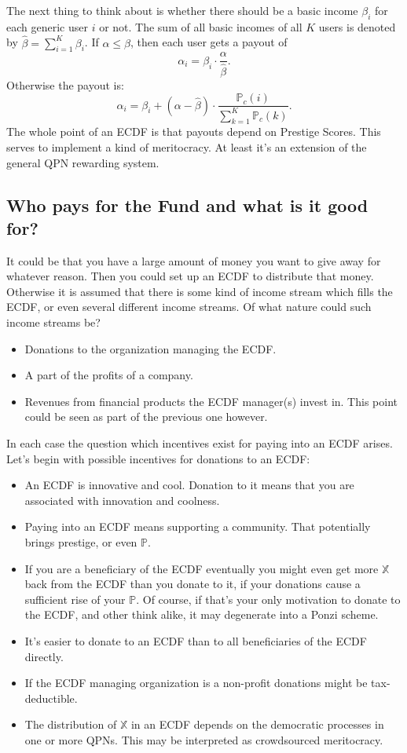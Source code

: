 \documentclass[a4paper,12pt]{scrartcl}
\newcounter{motivation}
\begin{document}
The next thing to think about is whether there should be a basic income $\beta_i$ for each generic user $i$ or not. The sum of all basic incomes of all $K$ users is denoted by $\hat{\beta} = \sum_{i=1}^K \beta_i$. If $\alpha \leq \hat{\beta}$, then each user gets a payout of
$$\alpha_i = \beta_i \cdot \frac{\alpha}{\hat{\beta}}.$$
Otherwise the payout is:
$$\alpha_i = \beta_i + (\alpha - \hat{\beta}) \cdot \frac{\mathbb{P}_c(i)}{\sum_{k=1}^K \mathbb{P}_c(k)}.$$
The whole point of an ECDF is that payouts depend on Prestige Scores. This serves to implement a kind of meritocracy. At least it's an extension of the general QPN rewarding system.


\subsection{Who pays for the Fund and what is it good for?}
It could be that you have a large amount of money you want to give away for whatever reason. Then you could set up an ECDF to distribute that money. Otherwise it is assumed that there is some kind of income stream which fills the ECDF, or even several different income streams. Of what nature could such income streams be?
\begin{itemize}
 \item Donations to the organization managing the ECDF.
 \item A part of the profits of a company.
 \item Revenues from financial products the ECDF manager(s) invest in. This point could be seen as part of the previous one however.
\end{itemize}

In each case the question which incentives exist for paying into an ECDF arises. Let's begin with possible incentives for donations to an ECDF:
\begin{itemize}
 \item An ECDF is innovative and cool. Donation to it means that you are associated with innovation and coolness.
 \item Paying into an ECDF means supporting a community. That potentially brings prestige, or even $\mathbb{P}$.
 \item If you are a beneficiary of the ECDF eventually you might even get more $\mathbb{X}$ back from the ECDF than you donate to it, if your donations cause a sufficient rise of your $\mathbb{P}$. Of course, if that's your only motivation to donate to the ECDF, and other think alike, it may degenerate into a Ponzi scheme.
 \item It's easier to donate to an ECDF than to all beneficiaries of the ECDF directly.
 \item If the ECDF managing organization is a non-profit donations might be tax-deductible.
 \item The distribution of $\mathbb{X}$ in an ECDF depends on the democratic processes in one or more QPNs. This may be interpreted as crowdsourced meritocracy.
\end{itemize}
\end{document}
